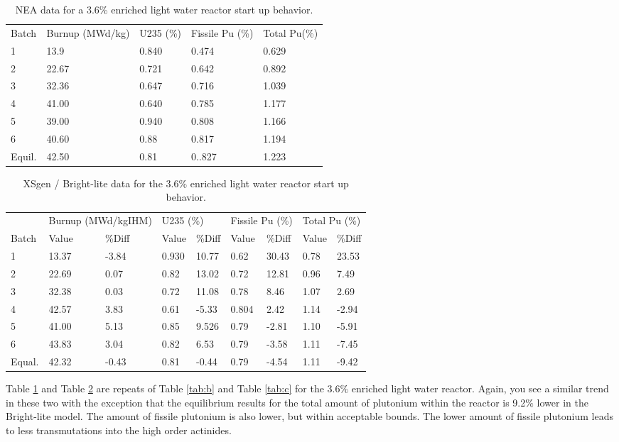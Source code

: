 \documentclass{article}
\begin{document}
\begin{table}[!htb]
\centering
\caption{NEA data for a 3.6\% enriched light water reactor start up behavior.}
\label{tab:d}
\begin{tabular}{lllll}
Batch & Burnup (MWd/kg) & U235 (\%) & Fissile Pu (\%) & Total Pu(\%) \\
1 & 13.9 & 0.840 & 0.474 & 0.629 \\
2 & 22.67 & 0.721 & 0.642 & 0.892 \\
3 & 32.36 & 0.647 & 0.716 & 1.039 \\
4 & 41.00 & 0.640 & 0.785 & 1.177 \\
5 & 39.00 & 0.940 & 0.808 & 1.166 \\
6 & 40.60 & 0.88 & 0.817 & 1.194 \\
Equil. & 42.50 & 0.81 & 0..827 & 1.223
\end{tabular}
\end{table}

\begin{table}[!htb]
\centering
\caption{XSgen / Bright-lite data for the 3.6\% enriched light water reactor start up behavior.}
\label{tab:e}
\begin{tabular}{l ll | ll | ll | ll}
 & \multicolumn{2}{l}{Burnup (MWd/kgIHM)} & \multicolumn{2}{l}{U235 (\%)} & \multicolumn{2}{l}{Fissile Pu (\%)} & \multicolumn{2}{l}{Total Pu (\%)} \\
Batch & Value & \%Diff & Value & \%Diff & Value & \%Diff & Value & \%Diff \\
1 & 13.37 & -3.84 & 0.930 & 10.77 & 0.62 & 30.43 & 0.78 & 23.53 \\
2 & 22.69 & 0.07 & 0.82 & 13.02 & 0.72 & 12.81 & 0.96 & 7.49 \\
3 & 32.38 & 0.03 & 0.72 & 11.08 & 0.78 & 8.46 & 1.07 & 2.69 \\
4 & 42.57 & 3.83 & 0.61 & -5.33 & 0.804 & 2.42 & 1.14 & -2.94 \\
5 & 41.00 & 5.13 & 0.85 & 9.526 & 0.79 & -2.81 & 1.10 & -5.91 \\
6 & 43.83 & 3.04 & 0.82 & 6.53 & 0.79 & -3.58 & 1.11 & -7.45 \\
Equal. & 42.32 & -0.43 & 0.81 & -0.44 & 0.79 & -4.54 & 1.11 & -9.42
\end{tabular}
\end{table}

Table \ref{tab:d} and Table \ref{tab:e} are repeats of Table \ref{tab:b} and Table \ref{tab:c} for the 3.6$\%$ enriched light water reactor. Again, you see a similar trend in these two with the exception that the equilibrium results for the total amount of plutonium within the reactor is 9.2$\%$ lower in the Bright-lite model. The amount of fissile plutonium is also lower, but within acceptable bounds. The lower amount of fissile plutonium leads to less transmutations into the high order actinides.
\end{document}

